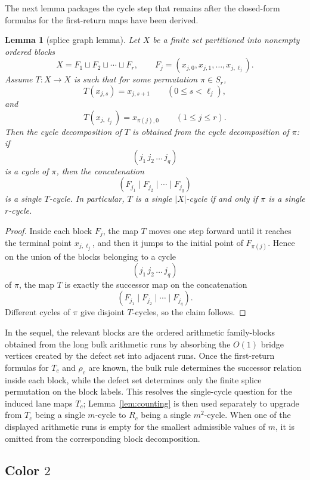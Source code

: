 \documentclass[11pt]{article}
\newtheorem{lemma}{Lemma}
\begin{document}
The next lemma packages the cycle step that remains after the closed-form formulas for the first-return maps have been derived.


\begin{lemma}[splice graph lemma]\label{lem:splice-graph}
Let $X$ be a finite set partitioned into nonempty ordered blocks
\[
X=F_1\sqcup F_2\sqcup \cdots \sqcup F_r,
\qquad
F_j=(x_{j,0},x_{j,1},\dots,x_{j,\ell_j}).
\]
Assume $T:X\to X$ is such that for some permutation $\pi\in S_r$,
\[
T(x_{j,s})=x_{j,s+1}\qquad (0\le s<\ell_j),
\]
and
\[
T(x_{j,\ell_j})=x_{\pi(j),0}\qquad (1\le j\le r).
\]
Then the cycle decomposition of $T$ is obtained from the cycle decomposition of $\pi$: if
\[
(j_1\,j_2\,\dots\,j_q)
\]
is a cycle of $\pi$, then the concatenation
\[
(F_{j_1}\mid F_{j_2}\mid \cdots \mid F_{j_q})
\]
is a single $T$-cycle.
In particular, $T$ is a single $|X|$-cycle if and only if $\pi$ is a single $r$-cycle.
\end{lemma}

\begin{proof}
Inside each block $F_j$, the map $T$ moves one step forward until it reaches the terminal point $x_{j,\ell_j}$, and then it jumps to the initial point of $F_{\pi(j)}$.
Hence on the union of the blocks belonging to a cycle
\[
(j_1\,j_2\,\dots\,j_q)
\]
of $\pi$, the map $T$ is exactly the successor map on the concatenation
\[
(F_{j_1}\mid F_{j_2}\mid \cdots \mid F_{j_q}).
\]
Different cycles of $\pi$ give disjoint $T$-cycles, so the claim follows.
\end{proof}

In the sequel, the relevant blocks are the ordered arithmetic family-blocks obtained from the long bulk arithmetic runs by absorbing the $O(1)$ bridge vertices created by the defect set into adjacent runs.
Once the first-return formulas for $T_c$ and $\rho_c$ are known, the bulk rule determines the successor relation inside each block, while the defect set determines only the finite splice permutation on the block labels.
This resolves the single-cycle question for the induced lane maps $T_c$; Lemma~\ref{lem:counting} is then used separately to upgrade from $T_c$ being a single $m$-cycle to $R_c$ being a single $m^2$-cycle.
When one of the displayed arithmetic runs is empty for the smallest admissible values of $m$, it is omitted from the corresponding block decomposition.

\subsection{Color $2$}
\end{document}
